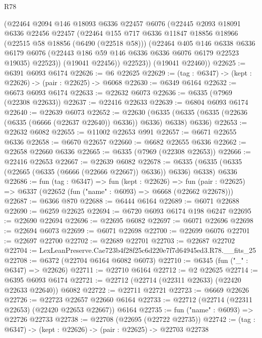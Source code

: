 \begin{lexlean}{R78}
\begin{coremodule}
        (@22464
          @2094
          @146
          @18093
          @6336
          @22457
          @6076
          (@22445
            @2093
            @18091
            @6336
            @22456
            @22457
            (@22464
              @155
              @717
              @6336
              @11847
              @18856
              @18966
              (@22515 @58 @18856 (@6490 (@22518 @58)))
              (@22464
                @405
                @146
                @6338
                @6336
                @6179
                @6076
                (@22443 @186 @59 @146 @6336 @6336 @6076 @6179 @22523 @19035)
                @22523))
            (@19041 @22456))
          @22523))
      (@19041 @22460))
@22625 := @6391 @6093 @6174
@22626 := @6 @22625
@22629 := (tag : @6347) -> (kept : @22626) -> (pair : @22625) -> @6068
@22630 := @6349 @6164
@22632 := @6673 @6093 @6174
@22633 := @22632 @6073
@22636 := @6335 (@7969 (@22308 @22633))
@22637 := @22416 @22633
@22639 := @6804 @6093 @6174
@22640 := @22639 @6073
@22652 := @22630
    (@6335 (@6335 (@6335 (@22636 (@6335 (@6666 (@22637 @22640)) @6336)) @6336) @6338) @6336)
@22653 := @22632 @6082
@22655 := @11002 @22653 @991
@22657 := @6671 @22655 @6336
@22658 := @6670 @22657
@22660 := @6682 @22655 @6336
@22662 := @22658 @22660 @6336
@22665 := @6335 (@7969 (@22308 @22653))
@22666 := @22416 @22653
@22667 := @22639 @6082
@22678 := @6335 (@6335 (@6335 (@22665 (@6335 (@6666 (@22666 @22667)) @6336)) @6336) @6338) @6336
@22686 := fun (tag : @6347) =>
  fun (kept : @22626) =>
  fun (pair : @22625) => @6337 (@22652 (fun ("name" : @6093) => @6668 (@22662 @22678)))
@22687 := @6366 @870
@22688 := @6444 @6164
@22689 := @6071 @22688
@22690 := @6259 @22625
@22694 := @6720 @6093 @6174 @198 @6247
@22695 := @22690 @22694
@22696 := @22695 @6082
@22697 := @6071 @22696
@22698 := @22694 @6073
@22699 := @6071 @22698
@22700 := @22699 @6076
@22701 := @22697 @22700
@22702 := @22689 @22701
@22703 := @22687 @22702
@22704 := LexLeanPreserve.Cae723b4f28f25c6d220e7f7d64945ed3.R78.__fits_25
@22708 := @6372 (@22704 @6164 @6082 @6073)
@22710 := @6345 (fun ("_" : @6347) => @22626)
@22711 := @22710 @6164
@22712 := @2 @22625
@22714 := @6395 @6093 @6174
@22721 := @22712 (@22714 (@22311 @22633) (@22420 @22633 @22640)) @6082
@22722 := @22711 @22721
@22723 := @6669 @22626
@22726 := @22723 @22657 @22660 @6164
@22733 := @22712 (@22714 (@22311 @22653) (@22420 @22653 @22667)) @6164
@22735 := fun ("name" : @6093) => @22726 @22733
@22738 := @22708 (@22695 (@22722 @22735))
@22742 := (tag : @6347) -> (kept : @22626) -> (pair : @22625) -> @22703 @22738

\end{coremodule}
\end{lexlean}
